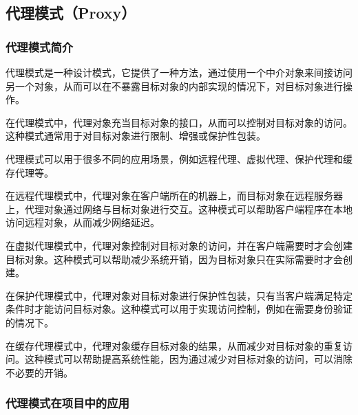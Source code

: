 \subsection{代理模式（Proxy）}

\subsubsection{代理模式简介}

代理模式是一种设计模式，它提供了一种方法，通过使用一个中介对象来间接访问另一个对象，从而可以在不暴露目标对象的内部实现的情况下，对目标对象进行操作。

在代理模式中，代理对象充当目标对象的接口，从而可以控制对目标对象的访问。这种模式通常用于对目标对象进行限制、增强或保护性包装。

代理模式可以用于很多不同的应用场景，例如远程代理、虚拟代理、保护代理和缓存代理等。

在远程代理模式中，代理对象在客户端所在的机器上，而目标对象在远程服务器上，代理对象通过网络与目标对象进行交互。这种模式可以帮助客户端程序在本地访问远程对象，从而减少网络延迟。

在虚拟代理模式中，代理对象控制对目标对象的访问，并在客户端需要时才会创建目标对象。这种模式可以帮助减少系统开销，因为目标对象只在实际需要时才会创建。

在保护代理模式中，代理对象对目标对象进行保护性包装，只有当客户端满足特定条件时才能访问目标对象。这种模式可以用于实现访问控制，例如在需要身份验证的情况下。

在缓存代理模式中，代理对象缓存目标对象的结果，从而减少对目标对象的重复访问。这种模式可以帮助提高系统性能，因为通过减少对目标对象的访问，可以消除不必要的开销。

\subsubsection{代理模式在项目中的应用}

